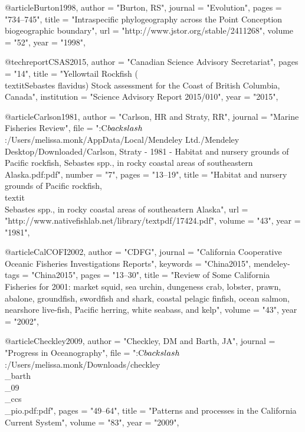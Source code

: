 @article{Burton1998,
    author = "{Burton, RS}",
    journal = "{Evolution}",
    pages = "{734--745}",
    title = "{{Intraspecific phylogeography across the Point Conception biogeographic boundary}}",
    url = "{http://www.jstor.org/stable/2411268}",
    volume = "{52}",
    year = "{1998}",
}

@techreport{CSAS2015,
    author = "{{Canadian Science Advisory Secretariat}}",
    pages = "{14}",
    title = "{{Yellowtail Rockfish (\\textit{{Sebastes} flavidus}) Stock assessment for the Coast of British Columbia, Canada}}",
    institution = "{{Science Advisory Report 2015/010}}",
    year = "{2015}",
}

@article{Carlson1981,
    author = "{Carlson, HR and Straty, RR}",
    journal = "{Marine Fisheries Review}",
    file = "{:C$\\backslash$:/Users/melissa.monk/AppData/Local/Mendeley Ltd./Mendeley Desktop/Downloaded/Carlson, Straty - 1981 - Habitat and nursery grounds of Pacific rockfish, Sebastes spp., in rocky coastal areas of southeastern Alaska.pdf:pdf}",
    number = "{7}",
    pages = "{13--19}",
    title = "{{Habitat and nursery grounds of Pacific rockfish, \\textit\\{{Sebastes}} spp., in rocky coastal areas of southeastern Alaska}}",
    url = "{http://www.nativefishlab.net/library/textpdf/17424.pdf}",
    volume = "{43}",
    year = "{1981}",
}

@article{CalCOFI2002,
    author = "{CDFG}",
    journal = "{California Cooperative Oceanic Fisheries Investigations Reports}",
    keywords = "{China2015}",
    mendeley-tags = "{China2015}",
    pages = "{13--30}",
    title = "{{Review of Some California Fisheries for 2001: market squid, sea urchin, dungeness crab, lobster, prawn, abalone, groundfish, swordfish and shark, coastal pelagic finfish, ocean salmon, nearshore live-fish, Pacific herring, white seabass, and kelp}}",
    volume = "{43}",
    year = "{2002}",
}

@article{Checkley2009,
    author = "{Checkley, DM and Barth, JA}",
    journal = "{Progress in Oceanography}",
    file = "{:C$\\backslash$:/Users/melissa.monk/Downloads/checkley\\_barth\\_09\\_ccs\\_pio.pdf:pdf}",
    pages = "{49--64}",
    title = "{{Patterns and processes in the California Current System}}",
    volume = "{83}",
    year = "{2009}",
}

